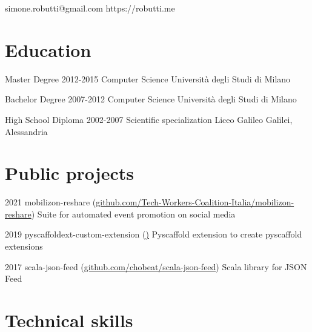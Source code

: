 \documentclass{tccv}
\begin{document}
    {simone.robutti@gmail.com}
    {https://robutti.me}

\section{Education}

\begin{yearlist}

\item[Master Degree]{2012-2015}
     {Computer Science}
     {Università degli Studi di Milano}

\item[Bachelor Degree]{2007-2012}
{Computer Science}
{Università degli Studi di Milano}

\item[High School Diploma]{2002-2007}
{Scientific specialization}
{Liceo Galileo Galilei, Alessandria}



\end{yearlist}

\section{Public projects}

\begin{yearlist}

\item{2021}
     {mobilizon-reshare (\href{https://github.com/Tech-Workers-Coalition-Italia/mobilizon-reshare}{github.com/Tech-Workers-Coalition-Italia/mobilizon-reshare})}
     {Suite for automated event promotion on social media}
\item{2019}
     {pyscaffoldext-custom-extension  (\href{github.com/pyscaffold/pyscaffoldext-custom-extension})}
     {Pyscaffold extension to create pyscaffold extensions}
\item{2017}
     {scala-json-feed (\href{https://github.com/chobeat/scala-json-feed}{github.com/chobeat/scala-json-feed})}
     {Scala library for JSON Feed}


\end{yearlist}

\section{Technical skills}
\end{document}
